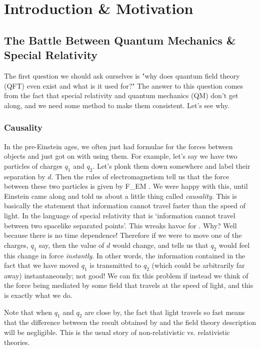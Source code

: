 \chapter{Introduction \& Motivation}

\section{The Battle Between Quantum Mechanics \& Special Relativity}

The first question we should ask ourselves is "why does quantum field theory (QFT) even exist and what is it used for?" The answer to this question comes from the fact that special relativity and quantum mechanics (QM) don't get along, and we need some method to make them consistent. Let's see why.

\subsection{Causality}

In the pre-Einstein ages, we often just had formulae for the forces between objects and just got on with using them. For example, let's say we have two particles of charges $q_1$ and $q_2$. Let's plonk them down somewhere and label their separation by $d$. Then the rules of electromagnetism tell us that the force between these two particles is given by 
\be 
\label{eqn:EMForce}
    F_{EM} \propto {}.
\ee
We were happy with this, until Einstein came along and told us about a little thing called \textit{causality}. This is basically the statement that information cannot travel faster than the speed of light. In the language of special relativity that is `information cannot travel between two spacelike separated points'. This wreaks havoc for . Why? Well because there is no time dependence! Therefore if we were to move one of the charges, $q_1$ say, then the value of $d$ would change, and  tells us that $q_2$ would feel this change in force \textit{instantly}. In other words, the information contained in the fact that we have moved $q_1$ is transmitted to $q_2$ (which could be arbitrarily far away) instantaneously; not good! We can fix this problem if instead we think of the force being mediated by some field that travels at the speed of light, and this is exactly what we do.

\br 
    Note that when $q_1$ and $q_2$ are close by, the fact that light travels so fast means that the difference between the result obtained by  and the field theory description will be negligible. This is the usual story of non-relativistic vs. relativistic theories. 
\er 

